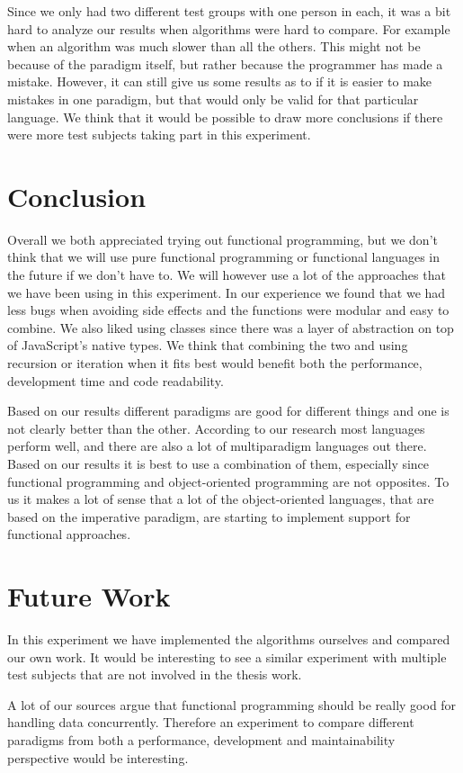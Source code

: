 \documentclass {article}
\begin{document}
Since we only had two different test groups with one person in each, it was a bit hard to analyze our results when algorithms were hard to compare. For example when an algorithm was much slower than all the others. This might not be because of the paradigm itself, but rather because the programmer has made a mistake. However, it can still give us some results as to if it is easier to make mistakes in one paradigm, but that would only be valid for that particular language. We think that it would be possible to draw more conclusions if there were more test subjects taking part in this experiment.

\section{Conclusion}
Overall we both appreciated trying out functional programming, but we don't think that we will use pure functional programming or functional languages in the future if we don't have to. We will however use a lot of the approaches that we have been using in this experiment. In our experience we found that we had less bugs when avoiding side effects and the functions were modular and easy to combine. We also liked using classes since there was a layer of abstraction on top of JavaScript's native types. We think that combining the two and using recursion or iteration when it fits best would benefit both the performance, development time and code readability. 

Based on our results different paradigms are good for different things and one is not clearly better than the other. According to our research most languages perform well, and there are also a lot of multiparadigm languages out there. Based on our results it is best to use a combination of them, especially since functional programming and object-oriented programming are not opposites. To us it makes a lot of sense that a lot of the object-oriented languages, that are based on the imperative paradigm, are starting to implement support for functional approaches. 

\section{Future Work}
In this experiment we have implemented the algorithms ourselves and compared our own work. It would be interesting to see a similar experiment with multiple test subjects that are not involved in the thesis work. 

A lot of our sources argue that functional programming should be really good for handling data concurrently. Therefore an experiment to compare different paradigms from both a performance, development and maintainability perspective would be interesting. 
\end{document}
